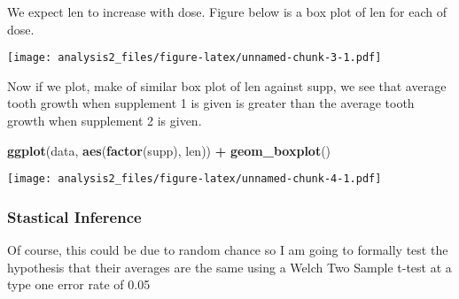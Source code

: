 \documentclass[
]{article}
\newenvironment{Shaded}{\begin{snugshade}}{\end{snugshade}}
\newcommand{\AttributeTok}[1]{\textcolor[rgb]{0.13,0.29,0.53}{#1}}
\newcommand{\ConstantTok}[1]{\textcolor[rgb]{0.56,0.35,0.01}{#1}}
\newcommand{\FunctionTok}[1]{\textcolor[rgb]{0.13,0.29,0.53}{\textbf{#1}}}
\newcommand{\NormalTok}[1]{#1}
\newcommand{\OtherTok}[1]{\textcolor[rgb]{0.56,0.35,0.01}{#1}}
\newcommand{\SpecialCharTok}[1]{\textcolor[rgb]{0.81,0.36,0.00}{\textbf{#1}}}
\newcommand{\StringTok}[1]{\textcolor[rgb]{0.31,0.60,0.02}{#1}}
\begin{document}
We expect len to increase with dose. Figure below is a box plot of len
for each of dose.

\begin{Shaded}
\end{Shaded}

\texttt{[image: analysis2\_files/figure-latex/unnamed-chunk-3-1.pdf]}

Now if we plot, make of similar box plot of len against supp, we see
that average tooth growth when supplement 1 is given is greater than the
average tooth growth when supplement 2 is given.

\begin{Shaded}
\begin{Highlighting}[]
\FunctionTok{ggplot}\NormalTok{(data, }\FunctionTok{aes}\NormalTok{(}\FunctionTok{factor}\NormalTok{(supp), len)) }\SpecialCharTok{+} 
  \FunctionTok{geom\_boxplot}\NormalTok{()}
\end{Highlighting}
\end{Shaded}

\texttt{[image: analysis2\_files/figure-latex/unnamed-chunk-4-1.pdf]}

\subsubsection{Stastical Inference}\label{stastical-inference}

Of course, this could be due to random chance so I am going to formally
test the hypothesis that their averages are the same using a Welch Two
Sample t-test at a type one error rate of 0.05

\begin{Shaded}
\end{Shaded}
\end{document}
